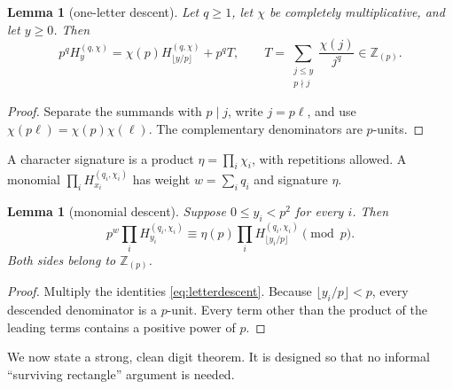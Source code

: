 \documentclass[11pt]{article}
\newtheorem{lemma}[theorem]{Lemma}
\theoremstyle{definition}
\theoremstyle{remark}
\newcommand{\Zp}{\mathbb Z_{(p)}}
\begin{document}
\begin{lemma}[one-letter descent]\label{lem:letterdescent}
Let $q\ge1$, let $\chi$ be completely multiplicative, and let $y\ge0$.  Then
\begin{equation}\label{eq:letterdescent}
 p^q H_y^{(q,\chi)}
 =\chi(p)H_{\lfloor y/p\rfloor}^{(q,\chi)}+p^qT,
 \qquad
 T=\sum_{\substack{j\le y\\p\nmid j}}\frac{\chi(j)}{j^q}\in\Zp.
\end{equation}
\end{lemma}

\begin{proof}
Separate the summands with $p\mid j$, write $j=p\ell$, and use
$\chi(p\ell)=\chi(p)\chi(\ell)$.  The complementary denominators are $p$-units.
\end{proof}

A character signature is a product $\eta=\prod_i\chi_i$, with repetitions allowed.  A
monomial $\prod_iH_{x_i}^{(q_i,\chi_i)}$ has weight $w=\sum_iq_i$ and signature $\eta$.

\begin{lemma}[monomial descent]\label{lem:monomial}
Suppose $0\le y_i<p^2$ for every $i$.  Then
\begin{equation}\label{eq:monomial}
 p^w\prod_iH_{y_i}^{(q_i,\chi_i)}
 \equiv \eta(p)\prod_iH_{\lfloor y_i/p\rfloor}^{(q_i,\chi_i)}\pmod p.
\end{equation}
Both sides belong to $\Zp$.
\end{lemma}

\begin{proof}
Multiply the identities \eqref{eq:letterdescent}.  Because
$\lfloor y_i/p\rfloor<p$, every descended denominator is a $p$-unit.  Every term other
than the product of the leading terms contains a positive power of $p$.
\end{proof}

We now state a strong, clean digit theorem.  It is designed so that no informal
``surviving rectangle'' argument is needed.
\end{document}

